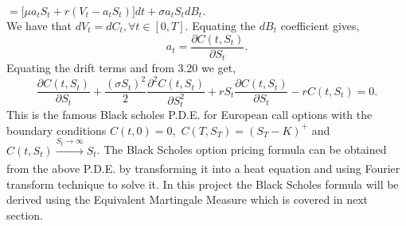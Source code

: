 \documentclass[12pt]{report}
\begin{document}
\hspace{5.7cm}$= \Big[\mu a_t S_t + r(V_t - a_t S_t)\Big]dt + \sigma a_t S_t dB_t.$\\
We have that $dV_t = dC_t, \forall t \in [0,T] $. Equating the $dB_t$ coefficient gives,\\
\begin{equation}
    a_t = \frac{\partial C(t,S_t)}{\partial S_t}.
\end{equation}
Equating the drift terms and from 3.20 we get,\\
\begin{equation}
\frac{\partial C(t,S_t)}{\partial S_t} + \frac{(\sigma S_{t})^{2}}{2} \frac{\partial^{2} C(t,S_t)}{\partial S_{t}^{2}}+rS_{t}\frac{\partial C(t,S_t)}{\partial S_t} - rC(t,S_t) = 0.
\end{equation}
This is the famous Black scholes P.D.E. for European call options with the boundary conditions $C(t,0) = 0,$ $C(T,S_T) = (S_T - K)^{+}$ and $ C(t,S_t)\xrightarrow[]{S_t \longrightarrow \infty} S_t$. The Black Scholes option pricing formula can be obtained from the above P.D.E. by transforming it into a heat equation and using Fourier transform technique to solve it. In this project the Black Scholes formula will be derived using the Equivalent Martingale Measure which is covered in next section.
\end{document}
